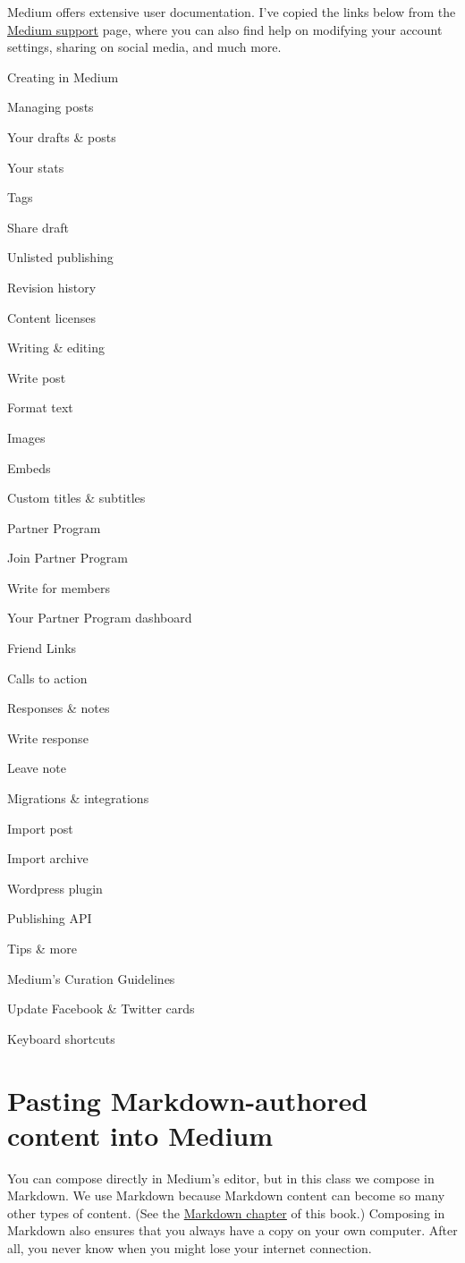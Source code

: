 \documentclass[]{book}
\theoremstyle{definition}
\theoremstyle{definition}
\theoremstyle{definition}
\theoremstyle{remark}
\begin{document}
Medium offers extensive user documentation. I've copied the links below
from the \href{https://help.medium.com/hc/en-us}{Medium support} page,
where you can also find help on modifying your account settings, sharing
on social media, and much more.

Creating in Medium

 Managing posts

Your drafts \& posts

Your stats

Tags

Share draft

Unlisted publishing

Revision history

Content licenses

 Writing \& editing

Write post

Format text

Images

Embeds

Custom titles \& subtitles

 Partner Program

Join Partner Program

Write for members

Your Partner Program dashboard

Friend Links

Calls to action

 Responses \& notes

Write response

Leave note

 Migrations \& integrations

Import post

Import archive

Wordpress plugin

Publishing API

 Tips \& more

Medium's Curation Guidelines

Update Facebook \& Twitter cards

Keyboard shortcuts

\hypertarget{pasting-markdown-authored-content-into-medium}{%
\section{Pasting Markdown-authored content into
Medium}\label{pasting-markdown-authored-content-into-medium}}

You can compose directly in Medium's editor, but in this class we
compose in Markdown. We use Markdown because Markdown content can become
so many other types of content. (See the
\protect\hyperlink{markdown}{Markdown chapter} of this book.) Composing
in Markdown also ensures that you always have a copy on your own
computer. After all, you never know when you might lose your internet
connection.
\end{document}
